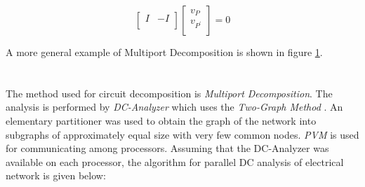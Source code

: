 \documentclass[10pt,psfig,letterpaper,twocolumn]{article}
\begin{document}
\begin{equation}
\left[\begin{array}{ll}
I & -I\\
\end{array}\right]
\left[\begin{array}{l}
v_{P} \\
v_{P^{'}}\\
\end{array}\right]
= 0
\end{equation}

A more general example of Multiport Decomposition is shown in figure \ref{multigen}.
\begin{figure}[!ht]
{\centering {} \par}
\caption{}
\label{multigen}
\end{figure}

\section*{}

The method used for circuit decomposition is {\it Multiport Decomposition}. The analysis is
performed by {\it DC-Analyzer} \cite{SHBP} which uses the {\it Two-Graph Method} \cite{SHBP}. An elementary 
partitioner was used to obtain the graph of the network into subgraphs of approximately equal size with very
few common nodes. 
{\it PVM} \cite{PVM,PVMS} is used for communicating among processors. Assuming that the DC-Analyzer was available on
each processor, the algorithm for parallel DC analysis of electrical network is given below:
\end{document}
